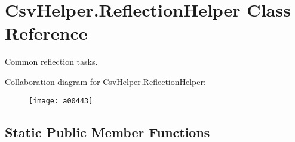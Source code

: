 \hypertarget{a00140}{\section{Csv\-Helper.\-Reflection\-Helper Class Reference}
\label{a00140}
}


Common reflection tasks.  




Collaboration diagram for Csv\-Helper.\-Reflection\-Helper\-:
\nopagebreak
\begin{figure}[H]
\begin{center}
\leavevmode
\texttt{[image: a00443]}
\end{center}
\end{figure}
\subsection*{Static Public Member Functions}
